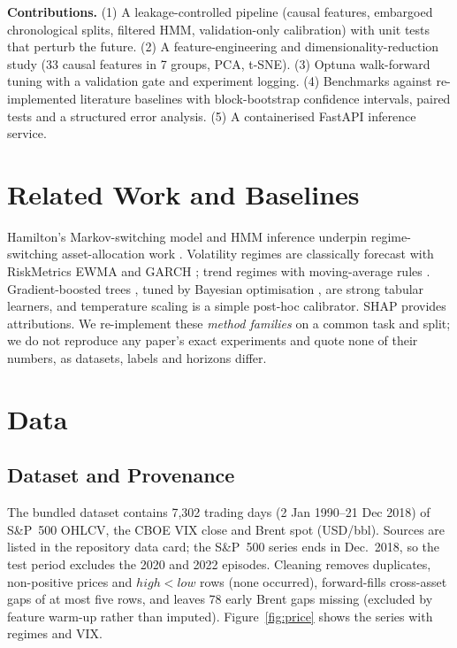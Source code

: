 \documentclass[conference]{IEEEtran}
\begin{document}
\textbf{Contributions.} (1) A leakage-controlled pipeline (causal features, embargoed chronological splits, filtered HMM, validation-only calibration) with unit tests that perturb the future. (2) A feature-engineering and dimensionality-reduction study (33 causal features in 7 groups, PCA, t-SNE). (3) Optuna walk-forward tuning with a validation gate and experiment logging. (4) Benchmarks against re-implemented literature baselines with block-bootstrap confidence intervals, paired tests and a structured error analysis. (5) A containerised FastAPI inference service.

\section{Related Work and Baselines}
Hamilton's Markov-switching model \cite{hamilton89} and HMM inference \cite{rabiner89} underpin regime-switching asset-allocation work \cite{angbekaert02,kritzman12}. Volatility regimes are classically forecast with RiskMetrics EWMA \cite{riskmetrics96} and GARCH \cite{bollerslev86}; trend regimes with moving-average rules \cite{faber07}. Gradient-boosted trees \cite{chen16,ke17}, tuned by Bayesian optimisation \cite{akiba19}, are strong tabular learners, and temperature scaling \cite{guo17} is a simple post-hoc calibrator. SHAP \cite{lundberg17} provides attributions. We re-implement these \emph{method families} on a common task and split; we do not reproduce any paper's exact experiments and quote none of their numbers, as datasets, labels and horizons differ.

\section{Data}
\subsection{Dataset and Provenance}
The bundled dataset contains 7{,}302 trading days (2 Jan 1990--21 Dec 2018) of S\&P~500 OHLCV, the CBOE VIX close and Brent spot (USD/bbl). Sources are listed in the repository data card; the S\&P~500 series ends in Dec.\ 2018, so the test period excludes the 2020 and 2022 episodes. Cleaning removes duplicates, non-positive prices and $high<low$ rows (none occurred), forward-fills cross-asset gaps of at most five rows, and leaves 78 early Brent gaps missing (excluded by feature warm-up rather than imputed). Figure~\ref{fig:price} shows the series with regimes and VIX.
\end{document}

